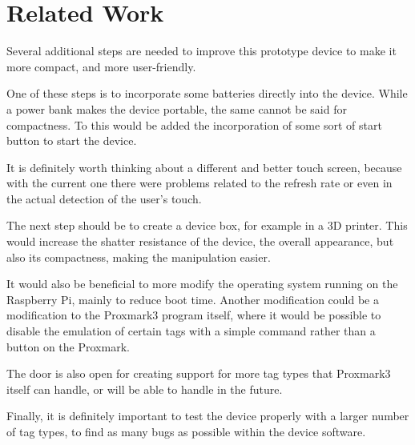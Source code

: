 \chapter{Related Work}

Several additional steps are needed to improve this prototype device to make it more compact, and more user-friendly.

One of these steps is to incorporate some batteries directly into the device. While a power bank makes the device portable, the same cannot be said for compactness. To this would be added the incorporation of some sort of start button to start the device. 

It is definitely worth thinking about a different and better touch screen, because with the current one there were problems related to the refresh rate or even in the actual detection of the user's touch.

The next step should be to create a device box, for example in a 3D printer. This would increase the shatter resistance of the device, the overall appearance, but also its compactness, making the manipulation easier.

It would also be beneficial to more modify the operating system running on the Raspberry Pi, mainly to reduce boot time. Another modification could be a modification to the Proxmark3 program itself, where it would be possible to disable the emulation of certain tags with a simple command rather than a button on the Proxmark.

The door is also open for creating support for more tag types that Proxmark3 itself can handle, or will be able to handle in the future.

Finally, it is definitely important to test the device properly with a larger number of tag types, to find as many bugs as possible within the device software.
